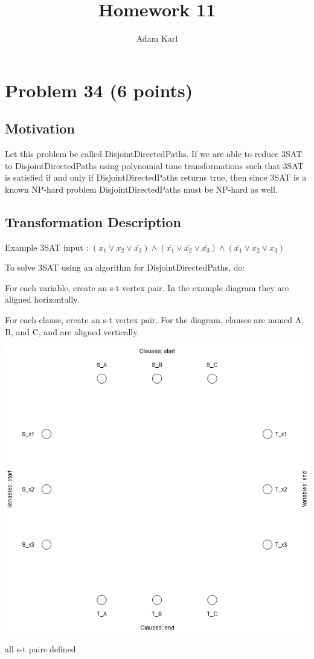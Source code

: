 \documentclass[a4paper]{article}
\title{Homework 11}
\author{Adam Karl}
\begin{document}
\maketitle

\section{Problem 34 (6 points)}
\subsection{Motivation}
Let this problem be called DisjointDirectedPaths. If we are able to reduce 3SAT to DisjointDirectedPaths using polynomial time transformations such that 3SAT is satisfied if and only if DisjointDirectedPaths returns true, then since 3SAT is a known NP-hard problem DisjointDirectedPaths must be NP-hard as well.

\subsection{Transformation Description}
Example 3SAT input : $(x_1 \vee x_2 \vee \overline{x_3}) \wedge (\overline{x_1} \vee \overline{x_2} \vee \overline{x_3}) \wedge (\overline{x_1} \vee x_2 \vee x_3)$ 

To solve 3SAT using an algorithm for DisjointDirectedPaths, do:

For each variable, create an s-t vertex pair. In the example diagram they are aligned horizontally.

For each clause, create an s-t vertex pair. For the diagram, clauses are named A, B, and C, and are aligned vertically.

\begin{center}
    \includegraphics[scale=.5]{hw11-setup.png}
    
    \caption{all s-t pairs defined}
\end{center}
\end{document}
